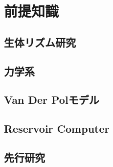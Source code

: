 \chapter{前提知識}

\section{生体リズム研究}
\section{力学系}
\section{Van Der Polモデル}
\section{Reservoir Computer}
\section{先行研究}

\clearpage